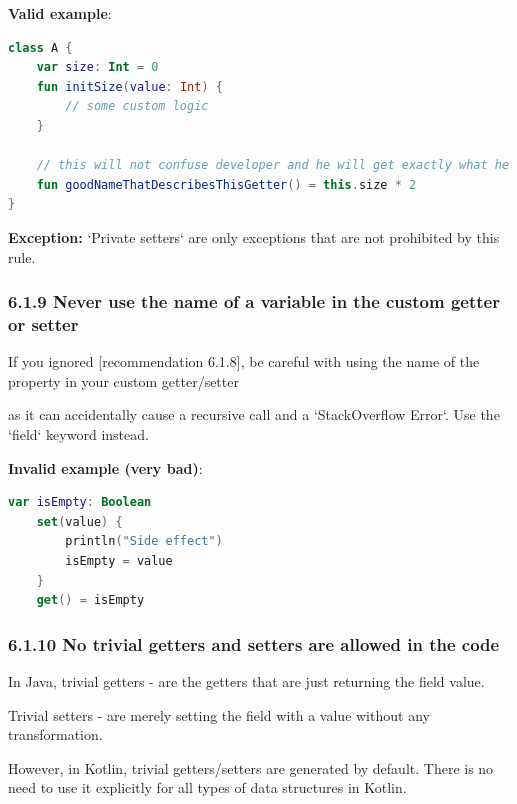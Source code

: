 {{{{\textbf{Valid example}:

\begin{lstlisting}[language=Kotlin]
class A {
    var size: Int = 0
    fun initSize(value: Int) {
        // some custom logic
    }
    
    // this will not confuse developer and he will get exactly what he expects    
    fun goodNameThatDescribesThisGetter() = this.size * 2
}
\end{lstlisting}


\textbf{Exception:} `Private setters` are only exceptions that are not prohibited by this rule.



\subsubsection*{\textbf{6.1.9 Never use the name of a variable in the custom getter or setter}}
\leavevmode\newline

If you ignored [recommendation 6.1.8], be careful with using the name of the property in your custom getter/setter

as it can accidentally cause a recursive call and a `StackOverflow Error`. Use the `field` keyword instead.



\textbf{Invalid example (very bad)}:

\begin{lstlisting}[language=Kotlin]
var isEmpty: Boolean
    set(value) {
        println("Side effect")
        isEmpty = value
    }
    get() = isEmpty
\end{lstlisting}


\subsubsection*{\textbf{6.1.10 No trivial getters and setters are allowed in the code}}
\leavevmode\newline

In Java, trivial getters - are the getters that are just returning the field value.

Trivial setters - are merely setting the field with a value without any transformation.

However, in Kotlin, trivial getters/setters are generated by default. There is no need to use it explicitly for all types of data structures in Kotlin.



}}}}
